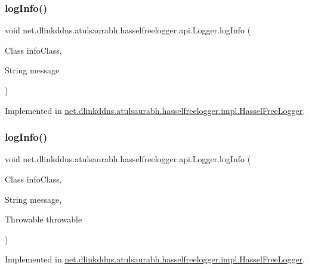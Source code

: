 \subsubsection{\texorpdfstring{log\+Info()}{logInfo()}\hspace{0.1cm}{\footnotesize\ttfamily [2/3]}}
{\footnotesize\ttfamily void net.\+dlinkddns.\+atulsaurabh.\+hasselfreelogger.\+api.\+Logger.\+log\+Info (\begin{DoxyParamCaption}\item[{Class}]{info\+Class,  }\item[{String}]{message }\end{DoxyParamCaption})}



Implemented in \mbox{\hyperlink{classnet_1_1dlinkddns_1_1atulsaurabh_1_1hasselfreelogger_1_1impl_1_1_hassel_free_logger_a011e8791e13b815927a16254e9cfa2a3}{net.\+dlinkddns.\+atulsaurabh.\+hasselfreelogger.\+impl.\+Hassel\+Free\+Logger}}.

\mbox{\label{interfacenet_1_1dlinkddns_1_1atulsaurabh_1_1hasselfreelogger_1_1api_1_1_logger_a07cf4314c71f95135245d10dffc14d2f}} 
\subsubsection{\texorpdfstring{log\+Info()}{logInfo()}\hspace{0.1cm}{\footnotesize\ttfamily [3/3]}}
{\footnotesize\ttfamily void net.\+dlinkddns.\+atulsaurabh.\+hasselfreelogger.\+api.\+Logger.\+log\+Info (\begin{DoxyParamCaption}\item[{Class}]{info\+Class,  }\item[{String}]{message,  }\item[{Throwable}]{throwable }\end{DoxyParamCaption})}



Implemented in \mbox{\hyperlink{classnet_1_1dlinkddns_1_1atulsaurabh_1_1hasselfreelogger_1_1impl_1_1_hassel_free_logger_ac0596a92805b29d9402a9eb17c71891a}{net.\+dlinkddns.\+atulsaurabh.\+hasselfreelogger.\+impl.\+Hassel\+Free\+Logger}}.

